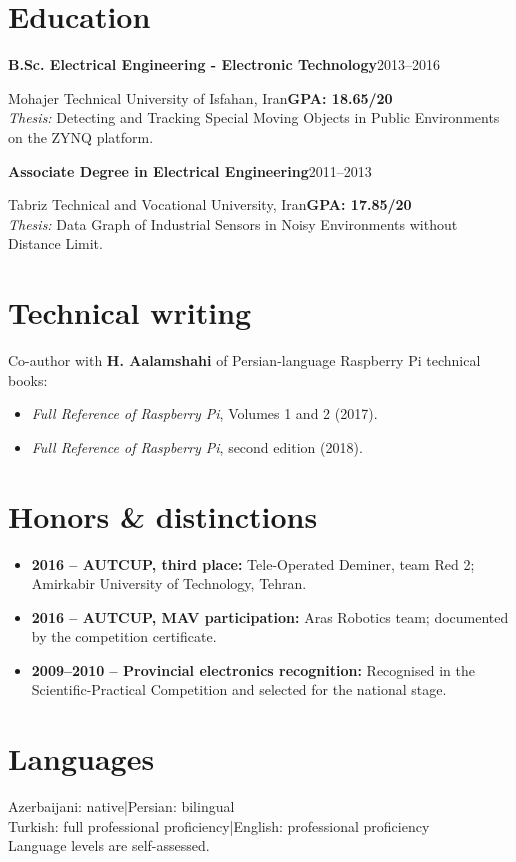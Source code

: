 \documentclass[11pt,a4paper]{article}
\newcommand{\entry}[2]{\textbf{#1}\hfill{\small\color{muted}#2}\par}
\begin{document}
\section*{Education}
\entry{B.Sc. Electrical Engineering - Electronic Technology}{2013--2016}
Mohajer Technical University of Isfahan, Iran\hfill\textbf{GPA: 18.65/20}\\
\textit{Thesis:} Detecting and Tracking Special Moving Objects in Public Environments on the ZYNQ platform.

\entry{Associate Degree in Electrical Engineering}{2011--2013}
Tabriz Technical and Vocational University, Iran\hfill\textbf{GPA: 17.85/20}\\
\textit{Thesis:} Data Graph of Industrial Sensors in Noisy Environments without Distance Limit.

\section*{Technical writing}
Co-author with \textbf{H. Aalamshahi} of Persian-language Raspberry Pi technical books:
\begin{itemize}
  \item \textit{Full Reference of Raspberry Pi}, Volumes 1 and 2 (2017).
  \item \textit{Full Reference of Raspberry Pi}, second edition (2018).
\end{itemize}

\section*{Honors \& distinctions}
\begin{itemize}
  \item \textbf{2016 -- AUTCUP, third place:} Tele-Operated Deminer, team Red 2; Amirkabir University of Technology, Tehran.
  \item \textbf{2016 -- AUTCUP, MAV participation:} Aras Robotics team; documented by the competition certificate.
  \item \textbf{2009--2010 -- Provincial electronics recognition:} Recognised in the Scientific-Practical Competition and selected for the national stage.
\end{itemize}

\section*{Languages}
Azerbaijani: native\enspace|\enspace Persian: bilingual\\
Turkish: full professional proficiency\enspace|\enspace English: professional proficiency\\
{\small\color{muted}Language levels are self-assessed.}
\end{document}
